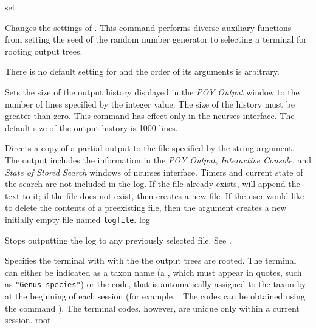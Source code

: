 \begin{command}{set}{}


	\begin{poydescription}
            Changes the settings of \poy. This command performs diverse auxiliary 
            functions from setting the seed of the random number generator to
            selecting a terminal for rooting output trees.
            
            There is no default setting for  and the order of its
            arguments is arbitrary.
            
	\end{poydescription}

	\begin{arguments}

            {Sets the size of the \poy output history displayed in the \emph{POY
            Output} window to the number of lines specified by the integer
            value. The size of the history must be greater than zero. This
            command has effect only in the ncurses interface. The default size
            of the output history is 1000 lines.}
             {}

            {Directs a copy of a partial output to the file specified by the
            string  argument. The output includes the  information in the
            \emph{POY Output}, \emph{Interactive Console},
            and \emph{State of Stored Search} windows
            of ncurses interface.  Timers and current state of the search are
            not included in the log. If the file already exists, \poy will
            append the text to it; if the file does not exist, then \poy creates
            a new file. If the user would like to delete the contents of a
            preexisting file, then the argument 
            creates a new initially empty file named \texttt{logfile}.}
            {log}

            {Stops outputting the log to any previously selected
            file. See .}
            {}

            {Specifies the terminal with with the the output trees are rooted.
            The terminal can either be indicated as a taxon name (a \poystring,
            which must appear in quotes, such as \texttt{"Genus\_species"}) or the code,
            that is automatically  assigned to the taxon by \poy at the beginning
            of each \poy session (for example, . The
            codes can be obtained using the command ).
            The terminal codes, however, are unique only within a current session.}
            {root}


\end{arguments}
\end{command}
